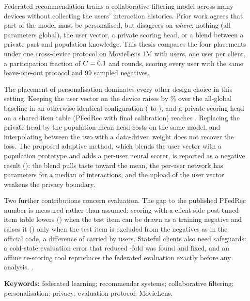 \abstractheader
{}
\thispagestyle{plain}

Federated recommendation trains a collaborative-filtering model across many devices without
collecting the users' interaction histories. Prior work agrees that part of the model must be
personalised, but disagrees on \emph{where}: nothing (all parameters global), the user vector, a
private scoring head, or a blend between a private part and population knowledge.
This thesis compares the four placements under one cross-device protocol on MovieLens 1M with
\DsUsers{} users, one user per client, a participation fraction of $C=0.1$ and
\NRounds{} rounds, scoring every user with the same leave-one-out protocol and 99 sampled
negatives.

The placement of personalisation dominates every other design choice in this setting. Keeping the user vector on the device raises \ndcg{} by
\GainPersonalizedVsBaselinePct\% over the all-global baseline in an otherwise identical
configuration (\NdcgBaseline{} to \NdcgPersonalized), and a private scoring head on a shared item
table (PFedRec with final calibration) reaches \NdcgPfedrec. Replacing the private head by the
population-mean head costs \AbsDeltaHeadGlobalHead{} \ndcg{} on the same model, and interpolating
between the two with a data-driven weight does not recover the loss. The proposed adaptive method,
which blends the user vector with a population prototype and adds a per-user neural scorer, is
reported as a negative result (\NdcgAdaptive): the blend pulls taste toward the mean, the per-user
network has \ParamsPersonalMlp{} parameters for a median of \DsMedianRatings{} interactions, and
the upload of the user vector weakens the privacy boundary.

Two further contributions concern evaluation. The gap to the published PFedRec number is measured
rather than assumed: scoring with a client-side post-tuned item table lowers \ndcg{}
(\NdcgEOneClean) when the test item can be drawn as a training negative and raises it
(\NdcgEOneLeaky) only when the test item is excluded from the negatives as in the official code, a
difference of \PtContrastEOne{} carried by \PtContrastEOneNonZero{} users. Stateful clients also
need safeguards: a cold-state evaluation error that reduced \ndcg{} \ColdEvalRatio-fold was found
and fixed, and an offline re-scoring tool reproduces the federated evaluation exactly before any
analysis. .

\medskip
\noindent\textbf{Keywords:} federated learning; recommender systems; collaborative filtering;
personalisation; privacy; evaluation protocol; MovieLens.
